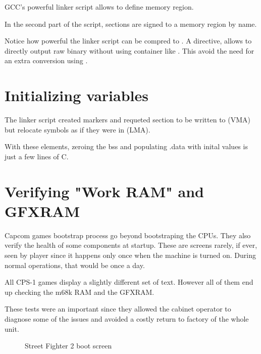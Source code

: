  GCC's powerful linker script allows to define memory region.





In the second part of the script, sections are signed to a memory region by name.



\begin{trivia}
Notice how powerful the linker script can be compred to . A directive,  allows to directly output raw binary without using container like . This avoid the need for an extra conversion using .
\end{trivia}

\section{Initializing variables}
The linker script created markers and requeted section  to be written to  (VMA) but relocate symbols as if they were in  (LMA).

With these elements, zeroing the bss and populating .data with inital values is just a few lines of C.



\section{Verifying "Work RAM" and GFXRAM}
Capcom games bootstrap process go beyond bootstraping the CPUs. They also verify the health of some components at startup. These are screens rarely, if ever, seen by player since it happens only once when the machine is turned on. During normal operations, that would be once a day.

All CPS-1 games display a slightly different set of text. However all of them end up checking the m68k RAM and the GFXRAM. 

These tests were an important since they allowed the cabinet operator to diagnose some of the issues and avoided a costly return to factory of the whole unit.



\vfill
\begin{figure}[H]
\caption*{Street Fighter 2 boot screen}
\end{figure}


